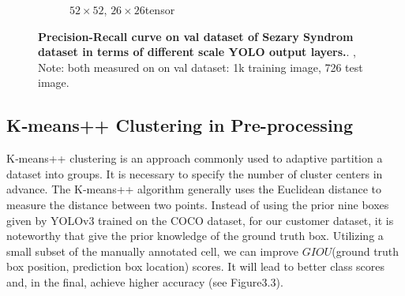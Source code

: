 \begin{figure}[h]
\begin{center}
\begin{subfigure}[b]{0.49\textwidth}
			\caption{$52 \times 52$, $26 \times 26$tensor }
			\label{fig:cellnet}
		\end{subfigure}
	\end{center}
	\caption{\textbf{Precision-Recall curve on val dataset of Sezary Syndrom dataset in terms of different scale YOLO output layers.}. ,  Note: both measured on on val dataset: 1k training image, 726 test image.}
\end{figure}


\subsection{K‐means++ Clustering in Pre-processing}

K‐means++ clustering is an approach commonly used to adaptive partition a dataset into groups. It is necessary to specify the number of cluster centers in advance. The K‐means++ algorithm generally uses the Euclidean distance to measure the distance between two points. Instead of using the prior nine boxes given by YOLOv3\cite{33} trained on the COCO dataset, for our customer dataset, it is noteworthy that give the prior knowledge of the ground truth box. Utilizing a small subset of the manually annotated cell, we can improve $GIOU$(ground truth box position, prediction box location) scores. It will lead to better class scores and, in the final, achieve higher accuracy (see Figure3.3).


